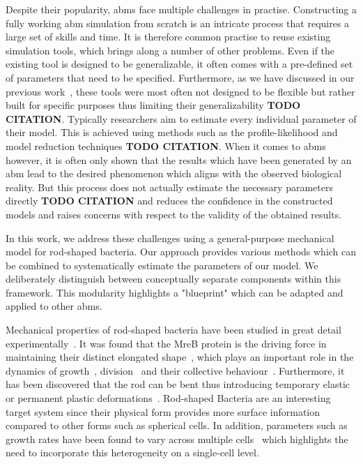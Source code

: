 \documentclass{article}
\begin{document}
Despite their popularity, \acp{abm} face multiple challenges in practise.
Constructing a fully working \ac{abm} simulation from scratch is an intricate process that requires
a large set of skills and time.
It is therefore common practise to reuse existing simulation tools, which brings along a number of
other problems.
Even if the existing tool is designed to be generalizable, it often comes with a pre-defined set
of parameters that need to be specified.
Furthermore, as we have discussed in our previous work~\cite{Pleyer2023}, these tools were most
often not designed to be flexible but rather built for specific purposes thus limiting their
generalizability \textbf{TODO CITATION}.
Typically researchers aim to estimate every individual parameter of their model.
This is achieved using methods such as the profile-likelihood and model reduction
techniques \textbf{TODO CITATION}.
When it comes to \acp{abm} however, it is often only shown that the results which have been
generated by an \ac{abm} lead to the desired phenomenon which aligns with the observed biological
reality.
But this process does not actually estimate the necessary parameters directly \textbf{TODO CITATION}
and reduces the confidence in the constructed models and raises concerns with respect to the
validity of the obtained results.

In this work, we address these challenges using a general-purpose mechanical model for rod-shaped
bacteria.
Our approach provides various methods which can be combined to systematically estimate the
parameters of our model.
We deliberately distinguish between conceptually separate components within this framework.
This modularity highlights a "blueprint" which can be adapted and applied to other \acp{abm}.

Mechanical properties of rod-shaped bacteria have been studied in great detail
experimentally~\cite{Chatterjee1988,Takeuchi2005,IWAI2002}.
It was found that the MreB protein is the driving force in maintaining their distinct elongated
shape~\cite{Ursell2014}, which plays an important role in the dynamics of
growth~\cite{Billaudeau2017}, division~\cite{Harry2001} and their collective
behaviour~\cite{vanGestel2015,Balagam2015}.
Furthermore, it has been discovered that the rod can be bent thus introducing temporary elastic or
permanent plastic deformations~\cite{Amir2014_2}.
Rod-shaped Bacteria are an interesting target system since their physical form provides more surface
information compared to other forms such as spherical cells.
In addition, parameters such as growth rates have been found to vary across multiple
cells~\cite{Koutsoumanis2013} which highlights the need to incorporate this heterogeneity on a
single-cell level.
\end{document}

